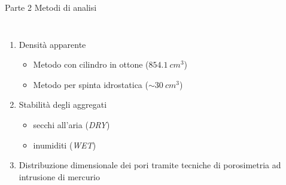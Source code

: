 \documentclass[10pt]{beamer}
\begin{document}
\begin{frame}{Parte 2 \small{Metodi di analisi}}
  \begin{columns}[c]
    \begin{enumerate}[<+->]
    \item Densit\`a apparente
      \begin{itemize}
      \item Metodo con cilindro in ottone ($854.1\: cm^3$)
        \pause
      \item Metodo per spinta idrostatica ($\sim 30 \: cm^3$)
        \pause
      \end{itemize}
    \item Stabilit\`a degli aggregati
       \begin{itemize}
       \item secchi all'aria (\emph{DRY})
       \item inumiditi (\emph{WET})
       \end{itemize}
    \item Distribuzione dimensionale dei pori tramite tecniche di
      porosimetria ad intrusione di mercurio      
    \end{enumerate}

\end{columns}
\end{frame}
\end{document}
